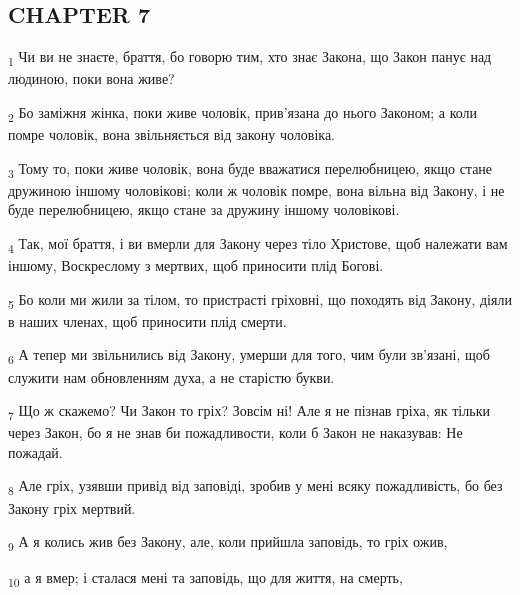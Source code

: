 \subsection{CHAPTER 7}
\begin{tcolorbox}
\textsubscript{1} Чи ви не знаєте, браття, бо говорю тим, хто знає Закона, що Закон панує над людиною, поки вона живе?
\end{tcolorbox}
\begin{tcolorbox}
\textsubscript{2} Бо заміжня жінка, поки живе чоловік, прив'язана до нього Законом; а коли помре чоловік, вона звільняється від закону чоловіка.
\end{tcolorbox}
\begin{tcolorbox}
\textsubscript{3} Тому то, поки живе чоловік, вона буде вважатися перелюбницею, якщо стане дружиною іншому чоловікові; коли ж чоловік помре, вона вільна від Закону, і не буде перелюбницею, якщо стане за дружину іншому чоловікові.
\end{tcolorbox}
\begin{tcolorbox}
\textsubscript{4} Так, мої браття, і ви вмерли для Закону через тіло Христове, щоб належати вам іншому, Воскреслому з мертвих, щоб приносити плід Богові.
\end{tcolorbox}
\begin{tcolorbox}
\textsubscript{5} Бо коли ми жили за тілом, то пристрасті гріховні, що походять від Закону, діяли в наших членах, щоб приносити плід смерти.
\end{tcolorbox}
\begin{tcolorbox}
\textsubscript{6} А тепер ми звільнились від Закону, умерши для того, чим були зв'язані, щоб служити нам обновленням духа, а не старістю букви.
\end{tcolorbox}
\begin{tcolorbox}
\textsubscript{7} Що ж скажемо? Чи Закон то гріх? Зовсім ні! Але я не пізнав гріха, як тільки через Закон, бо я не знав би пожадливости, коли б Закон не наказував: Не пожадай.
\end{tcolorbox}
\begin{tcolorbox}
\textsubscript{8} Але гріх, узявши привід від заповіді, зробив у мені всяку пожадливість, бо без Закону гріх мертвий.
\end{tcolorbox}
\begin{tcolorbox}
\textsubscript{9} А я колись жив без Закону, але, коли прийшла заповідь, то гріх ожив,
\end{tcolorbox}
\begin{tcolorbox}
\textsubscript{10} а я вмер; і сталася мені та заповідь, що для життя, на смерть,
\end{tcolorbox}
